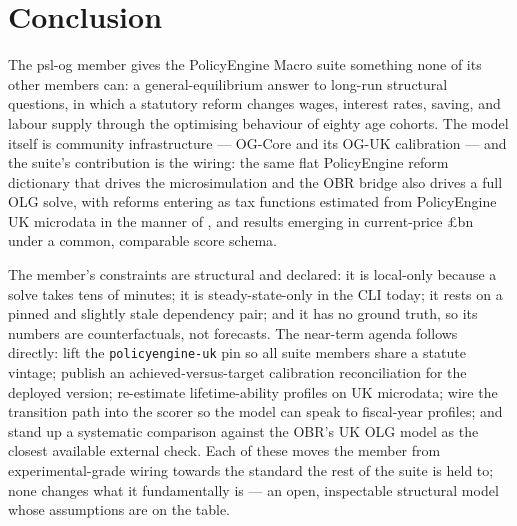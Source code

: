 \section{Conclusion}
\label{sec:conclusion}

The psl-og member gives the PolicyEngine Macro suite something none of its other members can: a general-equilibrium answer to long-run structural questions, in which a statutory reform changes wages, interest rates, saving, and labour supply through the optimising behaviour of eighty age cohorts. The model itself is community infrastructure --- OG-Core \citep{DeBackerEvans2024} and its OG-UK calibration \citep{OGUKdocs} --- and the suite's contribution is the wiring: the same flat PolicyEngine reform dictionary that drives the microsimulation and the OBR bridge also drives a full OLG solve, with reforms entering as tax functions estimated from PolicyEngine UK microdata in the manner of \citet{DeBackerEvansPhillips2019}, and results emerging in current-price \pounds bn under a common, comparable score schema.

The member's constraints are structural and declared: it is local-only because a solve takes tens of minutes; it is steady-state-only in the CLI today; it rests on a pinned and slightly stale dependency pair; and it has no ground truth, so its numbers are counterfactuals, not forecasts. The near-term agenda follows directly: lift the \texttt{policyengine-uk} pin so all suite members share a statute vintage; publish an achieved-versus-target calibration reconciliation for the deployed version; re-estimate lifetime-ability profiles on UK microdata; wire the transition path into the scorer so the model can speak to fiscal-year profiles; and stand up a systematic comparison against the OBR's UK OLG model \citep{OBR2025OLG} as the closest available external check. Each of these moves the member from experimental-grade wiring towards the standard the rest of the suite is held to; none changes what it fundamentally is --- an open, inspectable structural model whose assumptions are on the table.
